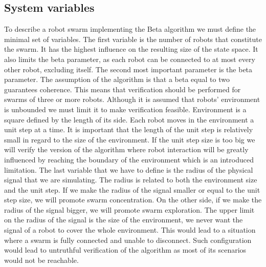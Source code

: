 \subsection{System variables}
To describe a robot swarm implementing the Beta algorithm we must define the minimal set of variables. The first variable is the number of robots that constitute the swarm. It has the highest influence on the resulting size of the state space. It also limits the beta parameter, as each robot can be connected to at most every other robot, excluding itself. The second most important parameter is the beta parameter. The assumption of the algorithm is that a beta equal to two guarantees coherence. This means that verification should be performed for swarms of three or more robots. Although it is assumed that robots' environment is unbounded we must limit it to make verification feasible. Environment is a square defined by the length of its side. Each robot moves in the environment a unit step at a time. It is important that the length of the unit step is relatively small in regard to the size of the environment. If the unit step size is too big we will verify the version of the algorithm where robot interaction will be greatly influenced by reaching the boundary of the environment which is an introduced limitation. The last variable that we have to define is the radius of the physical signal that we are simulating. The radius is related to both the environment size and the unit step. If we make the radius of the signal smaller or equal to the unit step size, we will promote swarm concentration. On the other side, if we make the radius of the signal bigger, we will promote swarm exploration. The upper limit on the radius of the signal is the size of the environment, we never want the signal of a robot to cover the whole environment. This would lead to a situation where a swarm is fully connected and unable to disconnect. Such configuration would lead to untruthful verification of the algorithm as most of its scenarios would not be reachable.



